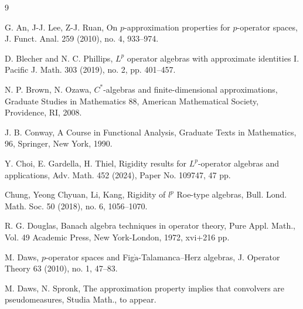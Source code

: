 \documentclass[reqno,11pt]{amsart}
\theoremstyle{plain}
\theoremstyle{definition}
\theoremstyle{remark}
\begin{document}
\begin{thebibliography}{9}

G. An, J-J. Lee, Z-J. Ruan, On $p$-approximation properties for $p$-operator spaces, J. Funct. Anal. 259 (2010), no. 4, 933--974.


        D. Blecher and N. C. Phillips, $L^{p}$ operator algebras with approximate identities I. Pacific
J. Math. 303 (2019), no. 2, pp. 401--457.

        N. P. Brown, N. Ozawa, $C^*$-algebras and finite-dimensional approximations, Graduate
        Studies in Mathematics 88, American Mathematical Society, Providence, RI, 2008.


J. B. Conway, A Course in Functional Analysis, Graduate Texts in Mathematics, 96, Springer, New York, 1990.


Y. Choi, E. Gardella, H. Thiel, Rigidity results for $L^p$-operator algebras and
applications, Adv. Math. 452 (2024), Paper No. 109747, 47 pp.

 Chung, Yeong Chyuan, Li, Kang, Rigidity of $l^p$ Roe-type algebras, Bull. Lond. Math. Soc. 50 (2018), no. 6, 1056--1070.


 R. G. Douglas, Banach algebra techniques in operator theory, Pure Appl. Math., Vol. 49
Academic Press, New York-London, 1972, xvi+216 pp.


M. Daws, $p$-operator spaces and Fig$\grave{\mathrm{a}}$-Talamanca–Herz algebras, J. Operator Theory   63 (2010), no. 1, 47--83.


M. Daws, N. Spronk, The approximation property implies that convolvers are
pseudomeasures, Studia Math., to appear.


\end{thebibliography}
\end{document}
